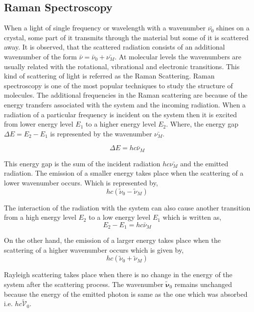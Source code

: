 \documentclass[openany,11pt,a4paper]{report}
\begin{document}
\subsection{Raman Spectroscopy}
When a light of single frequency or wavelength with a wavenumber $\bar{\nu_{0}}$ shines on a crystal, some part of it transmits through the material but some of it is scattered away. It is observed, that the scattered radiation consists of an additional wavenumber of the form $\bar{\nu}=\bar{\nu}_{0}+\bar{\nu_{M}}$. At molecular levels the wavenumbers are usually related with the rotational, vibrational and electronic transitions.  
This kind of scattering of light is referred as the Raman Scattering. Raman spectroscopy is one of the most popular techniques to study the structure of molecules.
The additional frequencies in the Raman scattering are because of the energy transfers associated with the system and the incoming radiation. When a radiation of a particular frequency is incident on the system then it is excited from lower energy level $E_{1}$ to a higher energy level $E_{2}$. Where, the energy gap $\Delta E = E_{2}-E_{1}$ is represented by the wavenumber $\bar{\nu_{M}}$. 

\begin{equation}
\Delta E=h c \bar{\nu}_{M}
\end{equation}

This energy gap is the sum of the incident radiation $hc\bar{\nu_{M}}$ and the emitted radiation. The emission of a smaller energy takes place when the scattering of a lower wavenumber occurs. Which is represented by, \begin{equation}
h c\left(\tilde{\nu}_{0}-\tilde{\nu}_{M}\right)
\end{equation}

The interaction of the radiation with the system can also cause another transition  from a high energy level $E_{2}$ to a low energy level $E_{1}$ which is written as,
\begin{equation}
E_{2}-E_{1}=h c \bar{\nu}_{M}
\end{equation}


On the other hand, the emission of a larger energy takes place when the scattering of a higher wavenumber occurs which is given by,
\begin{equation}
h c\left(\tilde{\nu}_{0}+\tilde{\nu}_{M}\right)
\end{equation}
 
Rayleigh scattering takes place when there is no change in the energy of the system after the scattering process. The wavenumber $\tilde{\boldsymbol{\nu}}_{0}$ remains unchanged because  the energy of the emitted photon is same as the one which was absorbed i.e. $h c \tilde{\mathcal{V}}_{0}$.  
 
\end{document}
